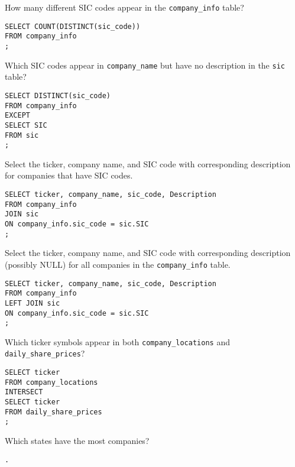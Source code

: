 \documentclass[10pt]{exam}
\begin{document}
\begin{questions}

\question How many different SIC codes appear in the \texttt{company\_info}
table?

\begin{solution}
\begin{lstlisting}
SELECT COUNT(DISTINCT(sic_code))
FROM company_info
;
\end{lstlisting}
\end{solution}

    \question Which SIC codes appear in \texttt{company\_name} but have no
    description in the \texttt{sic} table?

\begin{solution}
\begin{lstlisting}
SELECT DISTINCT(sic_code)
FROM company_info
EXCEPT
SELECT SIC
FROM sic
;
\end{lstlisting}
\end{solution}


\question Select the ticker, company name, and SIC code with corresponding description for
    companies that have SIC codes.

\begin{solution}
\begin{lstlisting}
SELECT ticker, company_name, sic_code, Description
FROM company_info
JOIN sic
ON company_info.sic_code = sic.SIC
;
\end{lstlisting}
\end{solution}

\question Select the ticker, company name, and SIC code with corresponding
    description (possibly NULL) for
    all companies in the \texttt{company\_info} table. 

\begin{solution}
\begin{lstlisting}
SELECT ticker, company_name, sic_code, Description
FROM company_info
LEFT JOIN sic
ON company_info.sic_code = sic.SIC
;
\end{lstlisting}
\end{solution}



    \question Which ticker symbols appear in both
    \texttt{company\_locations} and \texttt{daily\_share\_prices}?

\begin{solution}
\begin{lstlisting}
SELECT ticker
FROM company_locations
INTERSECT
SELECT ticker
FROM daily_share_prices
;
\end{lstlisting}
\end{solution}


\question Which states have the most companies?

\begin{solution}
\begin{lstlisting}
.
\end{lstlisting}
\end{solution}



\end{questions}
\end{document}
